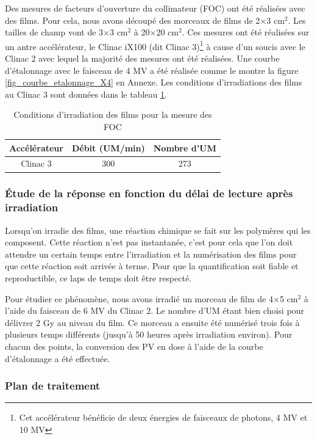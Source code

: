 \documentclass{book}
\begin{document}
Des mesures de facteurs d'ouverture du collimateur (FOC) ont été réalisées avec des films. Pour cela, nous avons découpé des morceaux de films de 2$\times$3 cm$^2$. Les tailles de champ vont de 3$\times$3 cm$^2$ à 20$\times$20 cm$^2$. Ces mesures ont été réalisées sur un antre accélérateur, le Clinac iX100 (dit Clinac 3)\footnote{Cet accélérateur bénéficie de deux énergies de faisceaux de photons, 4 MV et 10 MV} à cause d'un soucis avec le Clinac 2 avec lequel la majorité des mesures ont été réalisées. Une courbe d'étalonnage avec le faisceau de 4 MV a été réalisée comme le montre la figure \ref*{fig_courbe_etalonnage_X4} en Annexe. Les conditions d'irradiations des films au Clinac 3 sont données dans le tableau \ref*{table_conditions_films_FOC}.

\begin{table}[h]
  \centering
  \begin{tabular}{ccc}
    \toprule
    \textbf{Accélérateur} & \textbf{Débit (UM/min)} & \textbf{Nombre d'UM} \\
    \toprule
    Clinac 3 & 300 & 273 \\
    \bottomrule
  \end{tabular}
  \caption{Conditions d'irradiation des films pour la mesure des FOC}
  \label{table_conditions_films_FOC}
\end{table}

\subsubsection{Étude de la réponse en fonction du délai de lecture après irradiation}

Lorsqu'on irradie des films, une réaction chimique se fait sur les polymères qui les composent. Cette réaction n'est pas instantanée, c'est pour cela que l'on doit attendre un certain temps entre l'irradiation et la numérisation des films pour que cette réaction soit arrivée à terme. Pour que la quantification soit fiable et reproductible, ce laps de temps doit être respecté.

Pour étudier ce phénomène, nous avons irradié un morceau de film de 4$\times$5 cm$^2$ à l'aide du faisceau de 6 MV du Clinac 2. Le nombre d'UM étant bien choisi pour délivrer 2 Gy au niveau du film. Ce morceau a ensuite été numérisé trois fois à plusieurs temps différents (jusqu'à 50 heures après irradiation environ). Pour chacun des points, la conversion des PV en dose à l'aide de la courbe d'étalonnage a été effectuée. 

\subsubsection{Plan de traitement}
\end{document}
